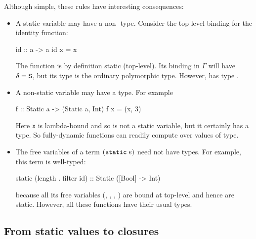 \documentclass[preprint]{sigplanconf}
\begin{document}
Although simple, these rules have interesting consequences:
\begin{itemize}
\item A static variable may have a non- type. Consider the 
top-level binding for the identity function:
\begin{code}
  id :: a -> a
  id x = x
\end{code}
The function  is by definition static (top-level).  Its binding
in $\Gamma$ will have $\delta=\text{\tt S}$, but its type is the ordinary
polymorphic type. However,  has type .


\item A non-static variable may have a  type.  For example
\begin{code}
  f :: Static a -> (Static a, Int)
  f x = (x, 3)
\end{code}
Here \texttt{x} is lambda-bound and so is not a static variable, but it certainly has
a  type.  So fully-dynamic functions
can readily compute over values of  type.

\item The free variables of a term $(\text{\tt static}\;e)$ need not have
 types. For example, this term is well-typed:
\par{\small
\begin{code}
static (length . filter id) :: Static ([Bool] -> Int)
\end{code}
}
because all its free variables (, ,
, ) are bound at top-level and hence are
static. However, all these functions have their usual types.
\end{itemize}

\subsection{From static values to closures}
\end{document}
